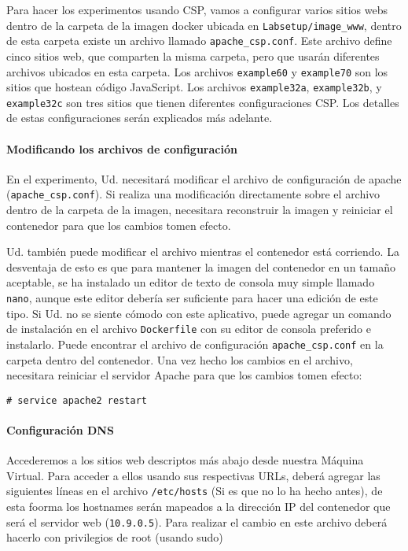 Para hacer los experimentos usando CSP, vamos a configurar varios sitios webs dentro de la carpeta de la imagen docker ubicada en \texttt{Labsetup/image\_www}, dentro de esta carpeta existe un archivo llamado \texttt{apache\_csp.conf}. 
Este archivo define cinco sitios web, que comparten la misma carpeta, pero que usarán diferentes archivos ubicados en esta carpeta.
Los archivos \texttt{example60} y \texttt{example70} son los sitios que hostean código JavaScript.
Los archivos \texttt{example32a}, \texttt{example32b}, y 
\texttt{example32c} son tres sitios que tienen diferentes configuraciones CSP. Los detalles de estas configuraciones serán explicados más adelante.


\paragraph{Modificando los archivos de configuración}
En el experimento, Ud. necesitará modificar el archivo de configuración de apache (\texttt{apache\_csp.conf}). Si realiza una modificación directamente sobre el archivo dentro de la carpeta de la imagen, necesitara reconstruir la imagen y reiniciar el contenedor para que los cambios tomen efecto.

Ud. también puede modificar el archivo mientras el contenedor está corriendo. La desventaja de esto es que para mantener la imagen del contenedor en un tamaño aceptable, se ha instalado un editor de texto de consola muy simple llamado \texttt{nano}, aunque este editor debería ser suficiente para hacer una edición de este tipo. Si Ud. no se siente cómodo con este aplicativo, puede agregar un comando de instalación en el archivo \texttt{Dockerfile} con su editor de consola preferido e instalarlo.
Puede encontrar el archivo de configuración \texttt{apache\_csp.conf} en la carpeta  dentro del contenedor.
Una vez hecho los cambios en el archivo, necesitara reiniciar el servidor Apache para que los cambios tomen efecto:

\begin{lstlisting}
# service apache2 restart
\end{lstlisting}


\paragraph{Configuración DNS}
Accederemos a los sitios web descriptos más abajo desde nuestra Máquina Virtual. 
Para acceder a ellos usando sus respectivas URLs, deberá agregar las siguientes líneas en el archivo \texttt{/etc/hosts} (Si es que no lo ha hecho antes), de esta foorma los hostnames serán mapeados a la dirección IP del contenedor que será el servidor web (\texttt{10.9.0.5}). 
Para realizar el cambio en este archivo deberá hacerlo con privilegios de root (usando sudo)

